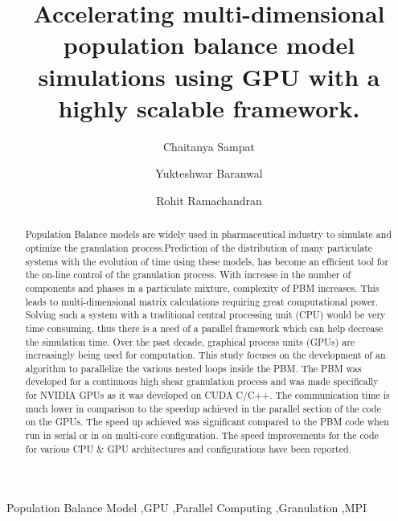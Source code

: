 \documentclass[preprint,10pt,authoryear]{elsarticle}
\begin{document}
\begin{frontmatter}
\title{Accelerating multi-dimensional population balance model simulations using GPU with a highly scalable framework.}


\author[label1]{Chaitanya Sampat}
\author[label1]{Yukteshwar Baranwal}
\address[label1]{Chemical and Biochemical Engineering, Rutgers University, Piscataway, NJ, USA - 08854}
\author[label1]{Rohit Ramachandran}

\begin{abstract}
Population Balance models are widely used in pharmaceutical industry to simulate
and optimize the granulation process.Prediction of the distribution of many 
particulate systems with the evolution of time using these models, has become an 
efficient tool for the on-line control of the granulation process. 
With increase in the number of components and phases in a particulate mixture, 
complexity of PBM increases. This leads to multi-dimensional matrix calculations 
requiring great computational power. Solving such a system with a traditional 
central processing unit (CPU) would be very time consuming, thus there is a 
need of a parallel framework which can help decrease the simulation time. 
Over the past decade, graphical process units (GPUs) are increasingly being 
used for computation. This study focuses on the development of an algorithm to 
parallelize the various nested loops inside the PBM. 
The PBM was developed for a continuous high shear granulation process and was made 
specifically for NVIDIA GPUs as it was developed on CUDA C/C++. The communication 
time is much lower in comparison to the speedup achieved in the parallel section 
of the code on the GPUs. The speed up achieved was significant compared to the PBM 
code when run in serial or in on multi-core configuration. The speed improvements 
for the code for various CPU \& GPU architectures and configurations have 
been reported. 
\end{abstract}

\begin{keyword}
Population Balance Model \sep GPU \sep Parallel Computing \sep Granulation \sep MPI
\end{keyword}

\end{frontmatter}
\end{document}
